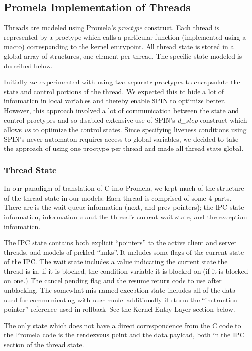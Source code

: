 \subsection{Promela Implementation of Threads}

Threads are modeled using Promela's {\it proctype} construct.
Each thread is represented by a proctype which calls a
particular function (implemented using a macro) 
corresponding to the kernel entrypoint. 
All thread state is stored in a global array of
structures, one element per thread.
The specific state modeled is described below.

Initially we experimented with using two separate 
proctypes to encapsulate the state and control portions of the
thread. We expected this to hide a lot of information in local
variables and thereby enable SPIN to optimize better. However, this
approach involved a lot of communication between the state and control
proctypes and so disabled extensive use of SPIN's {\it d_step}
construct which allows {\em us} to optimize the control states.
Since specifying liveness conditions using SPIN's never
automaton requires access to global variables, we decided to take the
approach of using one proctype per thread and made all thread
state global.

\subsubsection{Thread State}
In our paradigm of translation of C into Promela, we kept much of the
structure of the thread state in our models.  Each thread is comprised
of some 4 parts.  There are is the wait queue information (next, and
prev pointers); the IPC state information; information about the
thread's current wait state; and the exception information.  

The IPC state contains both explicit ``pointers'' to the active client
and server threads, and models of pickled ``links''.  It includes some
flags of the current state of the IPC.  The wait state includes a
value indicating the current state the thread is in, if it is blocked,
the condition variable it is blocked on (if it is blocked on one.)  The
cancel pending flag and the resume return code to use after
unblocking.  The somewhat mis-named exception state includes all of
the data used for communicating with user mode--additionally it stores
the ``instruction pointer'' reference used in rollback--See the
Kernel Entry Layer section below.

The only state which does not have a direct correspondence from the 
C code to the Promela code is the rendezvous point and
the data payload, both in the IPC section of the thread state.

